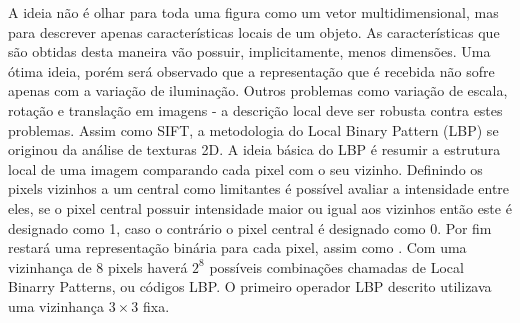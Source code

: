 A ideia não é olhar para toda uma figura como um vetor multidimensional, mas para descrever apenas características locais de um objeto. As características que são obtidas desta maneira vão possuir, implicitamente, menos dimensões. Uma ótima ideia,  porém será observado que a representação que é recebida não sofre apenas com a variação de iluminação. Outros problemas como variação de escala, rotação e translação em imagens - a descrição local deve ser robusta contra estes problemas. Assim como {\ttfamily SIFT}, a metodologia do Local Binary Pattern (LBP) se originou da análise de texturas 2D. A ideia básica do LBP é resumir a estrutura local de uma imagem comparando cada pixel com o seu vizinho. Definindo os pixels vizinhos a um central como limitantes é possível avaliar a intensidade entre eles, se o pixel central possuir intensidade maior ou igual aos vizinhos então este é designado como 1, caso o contrário o pixel central é designado como 0. Por fim restará uma representação binária para cada pixel, assim como {}. Com uma vizinhança de 8 pixels haverá $2^8$ possíveis combinações chamadas de Local Binarry Patterns, ou códigos LBP. O primeiro operador LBP descrito utilizava uma vizinhança $3 \times 3$ fixa.




